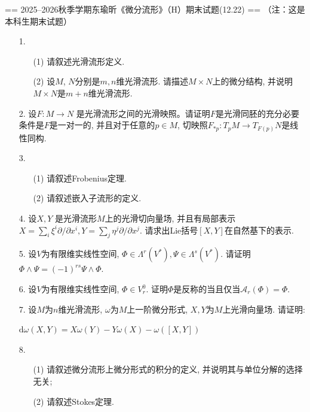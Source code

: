 == 2025--2026秋季学期东瑜昕《微分流形》（H）期末试题(12.22) ==
（注：这是本科生期末试题）
\begin{itemize}
    \item[1.]
    \begin{enumerate}
        \item[(1)]请叙述光滑流形定义.
        \item[(2)]设$M$, $N$分别是$m, n$维光滑流形. 请描述$M \times N$上的微分结构, 并说明$M \times N$是$m+n$维光滑流形.
    \end{enumerate}
    
    \item[2.]设$F: M \rightarrow N$ 是光滑流形之间的光滑映照。请证明$F$是光滑同胚的充分必要条件是$F$是一对一的, 并且对于任意的$p \in M$, 切映照$F_{*p}: T_{p} M \rightarrow T_{F(p)} N$是线性同构.
    
    \item[3.]
    \begin{enumerate}
        \item[(1)]请叙述Frobenius定理.
        \item[(2)]请叙述嵌入子流形的定义.
    \end{enumerate}
    
    \item[4.]设$X, Y$ 是光滑流形$M$上的光滑切向量场, 并且有局部表示$X = \sum_i \xi^i \partial/\partial x^i, Y = \sum_j \eta^j \partial/\partial x^j$. 请求出Lie括号$[X, Y]$在自然基下的表示.
    
    \item[5.]设$V$为有限维实线性空间, $\Phi \in \Lambda^r(V^*), \Psi \in \Lambda^s(V^*)$. 请证明$\Phi \wedge \Psi = (-1)^{rs} \Psi \wedge \Phi$.
    
    \item[6.]设$V$为有限维实线性空间, $\Phi \in V^0_r$. 证明$\Phi$是反称的当且仅当$\mathcal{A}_r(\Phi) = \Phi$.
    
    \item[7.]设$M$为$n$维光滑流形, $\omega$为$M$上一阶微分形式, $X, Y$为$M$上光滑向量场. 请证明:
    \begin{center}
        $\mathrm{d}\omega(X, Y) = X\omega(Y)-Y\omega(X)-\omega([X, Y])$
    \end{center}
    
    \item[8.]
    \begin{enumerate}
        \item[(1)]请叙述微分流形上微分形式的积分的定义, 并说明其与单位分解的选择无关;
        \item[(2)]请叙述Stokes定理.
    \end{enumerate}
\end{itemize}

